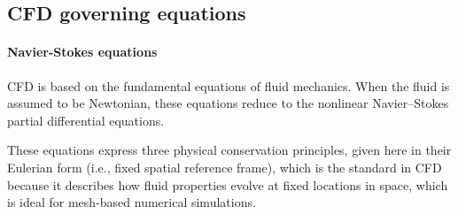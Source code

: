 \subsection{CFD governing equations}
\label{subsec:CFD_governing_equations}

\paragraph{Navier-Stokes equations} CFD is based on the fundamental equations of fluid mechanics. When the fluid is assumed to be Newtonian, these equations reduce to the nonlinear Navier–Stokes partial differential equations.

These equations express three physical conservation principles, given here in their Eulerian form (i.e., fixed spatial reference frame), which is the standard in CFD because it describes how fluid properties evolve at fixed locations in space, which is ideal for mesh-based numerical simulations.

